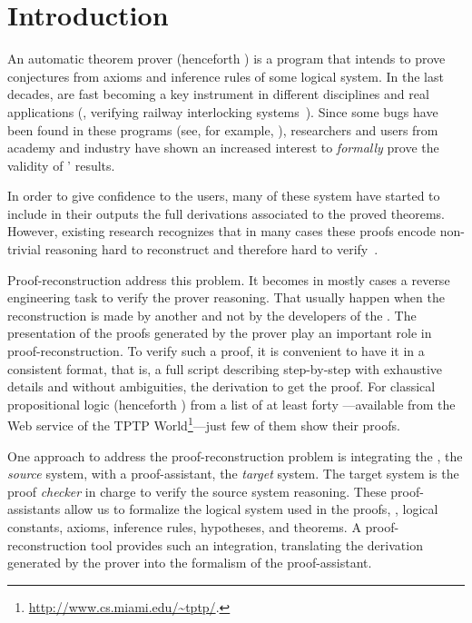 \documentclass[../main.tex]{subfiles}
\begin{document}

\section{Introduction}
\label{sec:introduction}

An automatic theorem prover (henceforth \ATP) is a program that
intends to prove conjectures from axioms and inference rules of some
logical system. In the last decades, \ATPs are fast becoming a key
instrument in different disciplines and real applications (\eg,
verifying railway interlocking systems~\cite{Kanso2012}). Since some
bugs have been found in these programs (see, for example,
\cite{Keller2013,Bohme2011,Fleury2014}), researchers and users from
academy and industry have shown an increased interest to
\emph{formally} prove the validity of \ATPs' results.

In order to give confidence to the \ATP users, many of these system
have started to include in their outputs the full derivations
associated to the proved theorems. However, existing research
recognizes that in many cases these proofs encode non-trivial
reasoning hard to reconstruct and therefore hard to
verify~\cite{paulson2007source,Keller2013}.

Proof-reconstruction address this problem. It becomes in mostly cases
a reverse engineering task to verify the prover reasoning. That
usually happen when the reconstruction is made by another and not by
the developers of the \ATP. The presentation of the proofs generated
by the prover play an important role in proof-reconstruction. To
verify such a proof, it is convenient to have it in a consistent
format, that is, a full script describing step-by-step with exhaustive
details and without ambiguities, the derivation to get the proof. For
classical propositional logic (henceforth \CPL) from a list of at
least forty \ATPs---available from the Web service 
of the TPTP
World\footnote{\url{http://www.cs.miami.edu/~tptp/}.}---just few of
them show their proofs.

One approach to address the proof-reconstruction problem is
integrating the \ATP, the \emph{source} system, with a
proof-assistant, the \emph{target} system. The target system is the
proof \emph{checker} in charge to verify the source system reasoning.
These proof-assistants allow us to formalize the logical system used
in the proofs, \ie, logical constants, axioms, inference rules,
hypotheses, and theorems. A proof-reconstruction tool provides such an
integration, translating the derivation generated by the prover into
the formalism of the proof-assistant.
\end{document}
